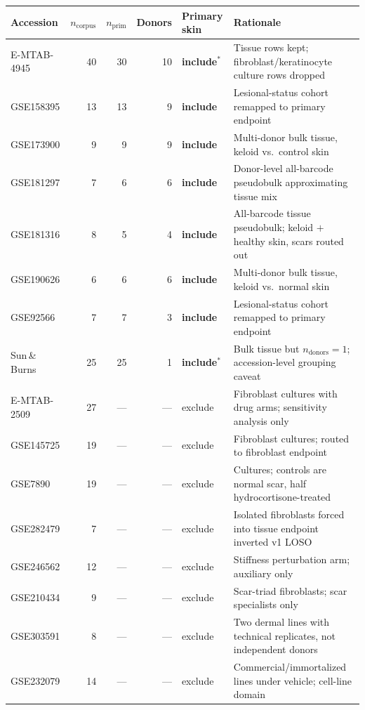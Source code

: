 {\footnotesize
\begin{tabularx}{\textwidth}{@{}lrrrlX@{}}
\toprule
Accession & $n_{\text{corpus}}$ & $n_{\text{prim}}$ & Donors & Primary skin & Rationale \\
\midrule
E-MTAB-4945 & 40 & 30 & 10 & \textbf{include}$^{*}$ & Tissue rows kept; fibroblast/keratinocyte culture rows dropped \\
GSE158395   & 13 & 13 & 9  & \textbf{include} & Lesional-status cohort remapped to primary endpoint \\
GSE173900   & 9  & 9  & 9  & \textbf{include} & Multi-donor bulk tissue, keloid vs.\ control skin \\
GSE181297   & 7  & 6  & 6  & \textbf{include} & Donor-level all-barcode pseudobulk approximating tissue mix \\
GSE181316   & 8  & 5  & 4  & \textbf{include} & All-barcode tissue pseudobulk; keloid $+$ healthy skin, scars routed out \\
GSE190626   & 6  & 6  & 6  & \textbf{include} & Multi-donor bulk tissue, keloid vs.\ normal skin \\
GSE92566    & 7  & 7  & 3  & \textbf{include} & Lesional-status cohort remapped to primary endpoint \\
Sun\,\&\,Burns & 25 & 25 & 1 & \textbf{include}$^{*}$ & Bulk tissue but $n_{\text{donors}}=1$; accession-level grouping caveat \\
\addlinespace
E-MTAB-2509 & 27  & --- & --- & exclude & Fibroblast cultures with drug arms; sensitivity analysis only \\
GSE145725   & 19  & --- & --- & exclude & Fibroblast cultures; routed to fibroblast endpoint \\
GSE7890     & 19  & --- & --- & exclude & Cultures; controls are normal scar, half hydrocortisone-treated \\
GSE282479   & 7   & --- & --- & exclude & Isolated fibroblasts forced into tissue endpoint inverted v1 LOSO \\
GSE246562   & 12  & --- & --- & exclude & Stiffness perturbation arm; auxiliary only \\
GSE210434   & 9   & --- & --- & exclude & Scar-triad fibroblasts; scar specialists only \\
GSE303591   & 8   & --- & --- & exclude & Two dermal lines with technical replicates, not independent donors \\
GSE232079   & 14  & --- & --- & exclude & Commercial/immortalized lines under vehicle; cell-line domain \\

\end{tabularx}}
